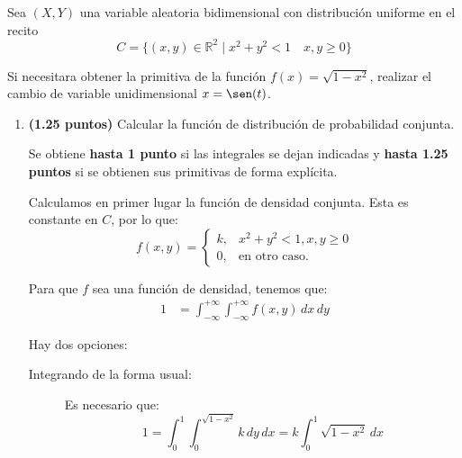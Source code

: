 \documentclass[12pt]{article}
\begin{document}
    \begin{ejercicio}
        Sea $(X,Y)$ una variable aleatoria bidimensional con distribución uniforme en el recito
        \begin{equation*}
            C = \{(x,y)\in \mathbb{R}^2 \mid x^2+y^2 < 1 \quad x,y\geq 0\}
        \end{equation*}
        \begin{observacion}
            Si necesitara obtener la primitiva de la función $f(x) = \sqrt{1-x^2}$, realizar el cambio de variable unidimensional $x=\sen(t)$.
        \end{observacion}
        \begin{enumerate}
            \item \textbf{(1.25 puntos)} Calcular la función de distribución de probabilidad conjunta.
            \begin{observacion}
                Se obtiene \textbf{hasta 1 punto} si las integrales se dejan indicadas y \textbf{hasta 1.25 puntos} si se obtienen sus primitivas de forma explícita.
            \end{observacion}

            Calculamos en primer lugar la función de densidad conjunta.
            Esta es constante en $C$, por lo que:
            \begin{equation*}
                f(x, y) = \begin{cases}
                    k, & x^2+y^2<1, x,y\geq 0 \\
                    0, & \text{en otro caso}.
                \end{cases}
            \end{equation*}

            Para que $f$ sea una función de densidad, tenemos que:
            \begin{align*}
                1&=\int_{-\infty}^{+\infty} \int_{-\infty}^{+\infty} f(x, y) \, dx \, dy
            \end{align*}

            Hay dos opciones:
            \begin{description}
                \item[Integrando de la forma usual:]
                
                Es necesario que:
                \begin{equation*}
                    1=\int_{0}^{1} \int_{0}^{\sqrt{1-x^2}} k \, dy \, dx = k\int_{0}^{1} \sqrt{1-x^2} \, dx
                \end{equation*}


\end{description}
\end{enumerate}
\end{ejercicio}
\end{document}
